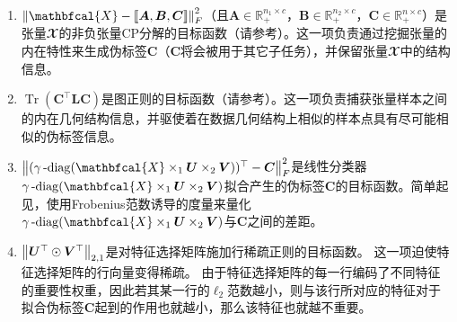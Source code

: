 \begin{enumerate}
    \item $\norm{\mathbfcal{X}-\left\llbracket \boldsymbol{A}, \boldsymbol{B}, \boldsymbol{C} \right\rrbracket}_{F}^{2}$（且$\boldsymbol{A}\in \mathbb{R}_{+}^{n_1 \times c}$，$\boldsymbol{B}\in \mathbb{R}_{+}^{n_2 \times c}$，$\boldsymbol{C}\in \mathbb{R}_{+}^{n \times c}$）是张量$\mathbfcal{X}$的非负张量CP分解的目标函数（请参考）。这一项负责通过挖掘张量的内在特性来生成伪标签$\boldsymbol{C}$（$\boldsymbol{C}$将会被用于其它子任务），并保留张量$\mathbfcal{X}$中的结构信息。

    \item $\operatorname{Tr}(\boldsymbol{C}^{\top}\boldsymbol{L}\boldsymbol{C})$是图正则的目标函数（请参考）。这一项负责捕获张量样本之间的内在几何结构信息，并驱使着在数据几何结构上相似的样本点具有尽可能相似的伪标签信息。

    \item $\norm{(\mydiag(\mathbfcal{X}\times_{1}\boldsymbol{U}\times_{2}\boldsymbol{V}))^{\top} - \boldsymbol{C}}_{F}^{2}$是线性分类器$\mydiag(\mathbfcal{X}\times_{1}\boldsymbol{U}\times_{2}\boldsymbol{V})$拟合产生的伪标签$\boldsymbol{C}$的目标函数。简单起见，使用Frobenius范数诱导的度量来量化$\mydiag(\mathbfcal{X}\times_{1}\boldsymbol{U}\times_{2}\boldsymbol{V})$与$\boldsymbol{C}$之间的差距。

    \item $\left\lVert\boldsymbol{U}^{\top}\odot\boldsymbol{V}^{\top}\right\rVert_{2,1}$是对特征选择矩阵施加行稀疏正则的目标函数。
    这一项迫使特征选择矩阵的行向量变得稀疏。
    由于特征选择矩阵的每一行编码了不同特征的重要性权重，因此若其某一行的$\ell_{2}$范数越小，则与该行所对应的特征对于拟合伪标签$\boldsymbol{C}$起到的作用也就越小，那么该特征也就越不重要。


\end{enumerate}
